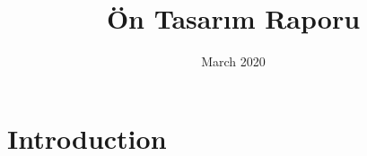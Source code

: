\documentclass{article}
\title{Ön Tasarım Raporu}
\author{}
\date{March 2020}
\begin{document}
\maketitle
\section{Introduction}
\end{document}
